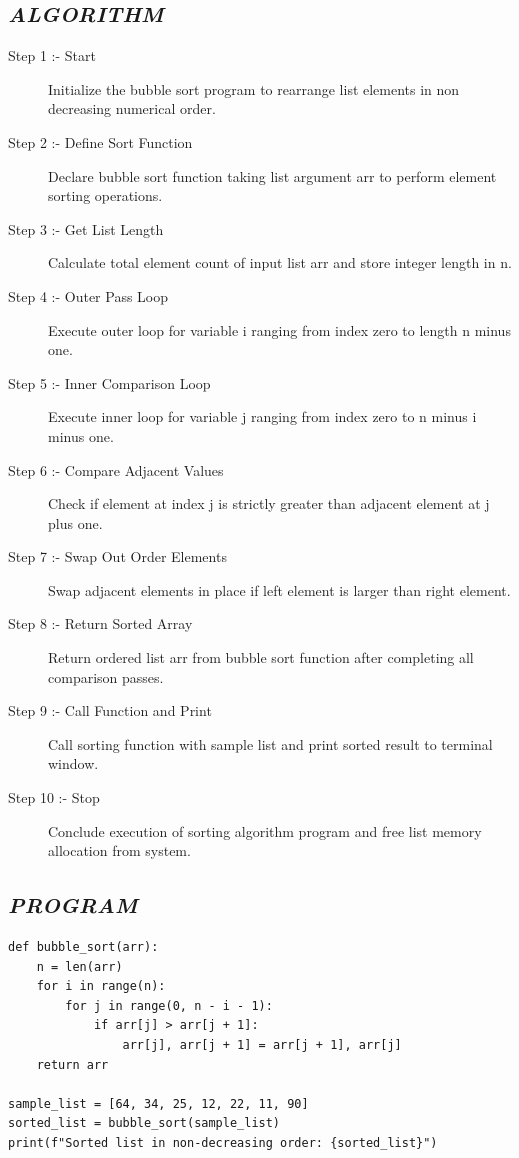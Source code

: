 \documentclass[11pt,a4paper]{article}
\begin{document}
\subsection*{\textit{ALGORITHM}}
\begin{description}
  \item[Step 1 :- Start] Initialize the bubble sort program to rearrange list elements in non decreasing numerical order.
  \item[Step 2 :- Define Sort Function] Declare bubble sort function taking list argument arr to perform element sorting operations.
  \item[Step 3 :- Get List Length] Calculate total element count of input list arr and store integer length in n.
  \item[Step 4 :- Outer Pass Loop] Execute outer loop for variable i ranging from index zero to length n minus one.
  \item[Step 5 :- Inner Comparison Loop] Execute inner loop for variable j ranging from index zero to n minus i minus one.
  \item[Step 6 :- Compare Adjacent Values] Check if element at index j is strictly greater than adjacent element at j plus one.
  \item[Step 7 :- Swap Out Order Elements] Swap adjacent elements in place if left element is larger than right element.
  \item[Step 8 :- Return Sorted Array] Return ordered list arr from bubble sort function after completing all comparison passes.
  \item[Step 9 :- Call Function and Print] Call sorting function with sample list and print sorted result to terminal window.
  \item[Step 10 :- Stop] Conclude execution of sorting algorithm program and free list memory allocation from system.
\end{description}

\subsection*{\textit{PROGRAM}}
\begin{lstlisting}[style=pythonstyle]
def bubble_sort(arr): 
    n = len(arr) 
    for i in range(n): 
        for j in range(0, n - i - 1): 
            if arr[j] > arr[j + 1]: 
                arr[j], arr[j + 1] = arr[j + 1], arr[j] 
    return arr 
 
sample_list = [64, 34, 25, 12, 22, 11, 90] 
sorted_list = bubble_sort(sample_list) 
print(f"Sorted list in non-decreasing order: {sorted_list}")
\end{lstlisting}
\end{document}
